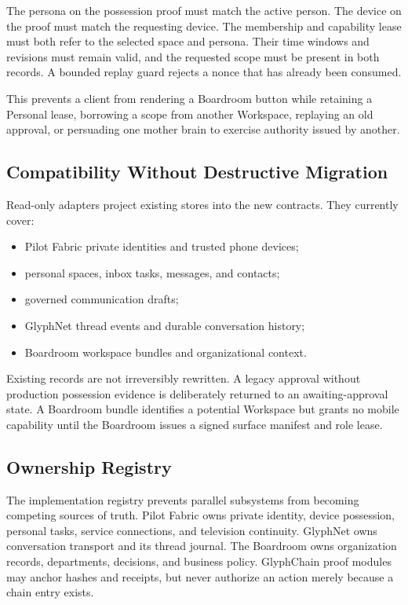 The persona on the possession proof must match the active person.  The device on the
proof must match the requesting device.  The membership and capability lease must both
refer to the selected space and persona.  Their time windows and revisions must remain
valid, and the requested scope must be present in both records.  A bounded replay guard
rejects a nonce that has already been consumed.

This prevents a client from rendering a Boardroom button while retaining a Personal
lease, borrowing a scope from another Workspace, replaying an old approval, or persuading
one mother brain to exercise authority issued by another.

\subsection{Compatibility Without Destructive Migration}

Read-only adapters project existing stores into the new contracts.  They currently cover:

\begin{itemize}
  \item Pilot Fabric private identities and trusted phone devices;
  \item personal spaces, inbox tasks, messages, and contacts;
  \item governed communication drafts;
  \item GlyphNet thread events and durable conversation history;
  \item Boardroom workspace bundles and organizational context.
\end{itemize}

Existing records are not irreversibly rewritten.  A legacy approval without production
possession evidence is deliberately returned to an awaiting-approval state.  A Boardroom
bundle identifies a potential Workspace but grants no mobile capability until the
Boardroom issues a signed surface manifest and role lease.

\subsection{Ownership Registry}

The implementation registry prevents parallel subsystems from becoming competing sources
of truth.  Pilot Fabric owns private identity, device possession, personal tasks, service
connections, and television continuity.  GlyphNet owns conversation transport and its
thread journal.  The Boardroom owns organization records, departments, decisions, and
business policy.  GlyphChain proof modules may anchor hashes and receipts, but never
authorize an action merely because a chain entry exists.


